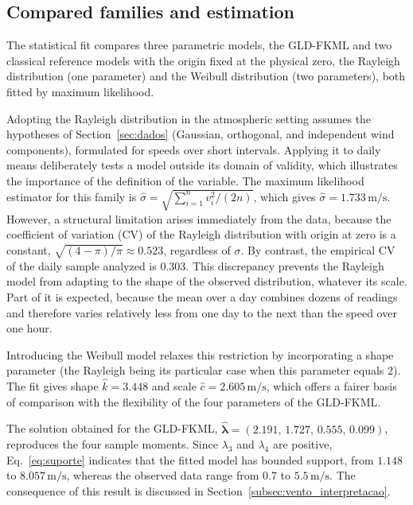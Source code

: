 \subsection{Compared families and estimation}

The statistical fit compares three parametric models, the GLD-FKML and two classical reference models with the origin fixed at the physical zero, the Rayleigh distribution (one parameter) and the Weibull distribution (two parameters), both fitted by maximum likelihood.

Adopting the Rayleigh distribution in the atmospheric setting assumes the hypotheses of Section~\ref{sec:dados} (Gaussian, orthogonal, and independent wind components), formulated for speeds over short intervals. Applying it to daily means deliberately tests a model outside its domain of validity, which illustrates the importance of the definition of the variable. The maximum likelihood estimator for this family is $\widehat\sigma = \sqrt{\sum_{i=1}^n v_i^2 / (2n)}$, which gives $\widehat\sigma = 1.733\,\text{m/s}$. However, a structural limitation arises immediately from the data, because the coefficient of variation (CV) of the Rayleigh distribution with origin at zero is a constant, $\sqrt{(4-\pi)/\pi} \approx 0.523$, regardless of $\sigma$. By contrast, the empirical CV of the daily sample analyzed is $0.303$. This discrepancy prevents the Rayleigh model from adapting to the shape of the observed distribution, whatever its scale. Part of it is expected, because the mean over a day combines dozens of readings and therefore varies relatively less from one day to the next than the speed over one hour.

Introducing the Weibull model relaxes this restriction by incorporating a shape parameter (the Rayleigh being its particular case when this parameter equals $2$). The fit gives shape $\widehat k = 3.448$ and scale $\widehat c = 2.605\,\text{m/s}$, which offers a fairer basis of comparison with the flexibility of the four parameters of the GLD-FKML.

The solution obtained for the GLD-FKML, $\widehat{\boldsymbol\lambda} = (2.191,\, 1.727,\, 0.555,\, 0.099)$, reproduces the four sample moments. Since $\lambda_3$ and $\lambda_4$ are positive, Eq.~\eqref{eq:suporte} indicates that the fitted model has bounded support, from $1.148$ to $8.057\,\text{m/s}$, whereas the observed data range from $0.7$ to $5.5\,\text{m/s}$. The consequence of this result is discussed in Section~\ref{subsec:vento_interpretacao}.

